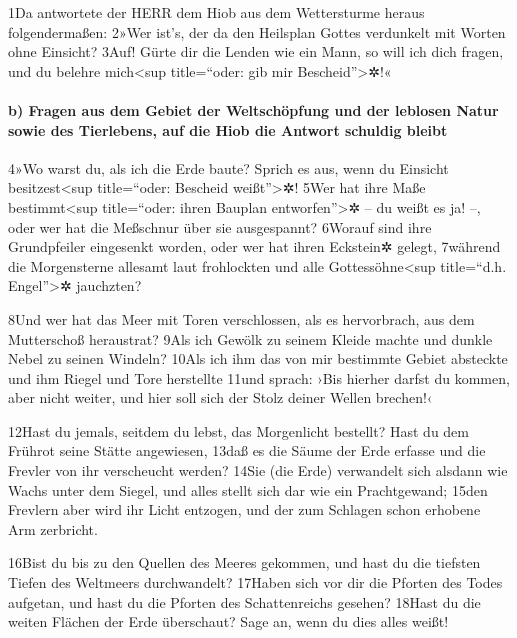 1Da antwortete der HERR dem Hiob aus dem Wettersturme heraus
folgendermaßen: 2»Wer ist's, der da den Heilsplan Gottes verdunkelt mit
Worten ohne Einsicht? 3Auf! Gürte dir die Lenden wie ein Mann, so will
ich dich fragen, und du belehre mich\textless sup title=``oder: gib mir
Bescheid''\textgreater✲!«

\hypertarget{b-fragen-aus-dem-gebiet-der-weltschuxf6pfung-und-der-leblosen-natur-sowie-des-tierlebens-auf-die-hiob-die-antwort-schuldig-bleibt}{%
\paragraph{b) Fragen aus dem Gebiet der Weltschöpfung und der leblosen
Natur sowie des Tierlebens, auf die Hiob die Antwort schuldig
bleibt}\label{b-fragen-aus-dem-gebiet-der-weltschuxf6pfung-und-der-leblosen-natur-sowie-des-tierlebens-auf-die-hiob-die-antwort-schuldig-bleibt}}

4»Wo warst du, als ich die Erde baute? Sprich es aus, wenn du Einsicht
besitzest\textless sup title=``oder: Bescheid weißt''\textgreater✲! 5Wer
hat ihre Maße bestimmt\textless sup title=``oder: ihren Bauplan
entworfen''\textgreater✲ -- du weißt es ja! --, oder wer hat die
Meßschnur über sie ausgespannt? 6Worauf sind ihre Grundpfeiler
eingesenkt worden, oder wer hat ihren Eckstein✲ gelegt, 7während die
Morgensterne allesamt laut frohlockten und alle Gottessöhne\textless sup
title=``d.h. Engel''\textgreater✲ jauchzten?

8Und wer hat das Meer mit Toren verschlossen, als es hervorbrach, aus
dem Mutterschoß heraustrat? 9Als ich Gewölk zu seinem Kleide machte und
dunkle Nebel zu seinen Windeln? 10Als ich ihm das von mir bestimmte
Gebiet absteckte und ihm Riegel und Tore herstellte 11und sprach: ›Bis
hierher darfst du kommen, aber nicht weiter, und hier soll sich der
Stolz deiner Wellen brechen!‹

12Hast du jemals, seitdem du lebst, das Morgenlicht bestellt? Hast du
dem Frührot seine Stätte angewiesen, 13daß es die Säume der Erde erfasse
und die Frevler von ihr verscheucht werden? 14Sie (die Erde) verwandelt
sich alsdann wie Wachs unter dem Siegel, und alles stellt sich dar wie
ein Prachtgewand; 15den Frevlern aber wird ihr Licht entzogen, und der
zum Schlagen schon erhobene Arm zerbricht.

16Bist du bis zu den Quellen des Meeres gekommen, und hast du die
tiefsten Tiefen des Weltmeers durchwandelt? 17Haben sich vor dir die
Pforten des Todes aufgetan, und hast du die Pforten des Schattenreichs
gesehen? 18Hast du die weiten Flächen der Erde überschaut? Sage an, wenn
du dies alles weißt!

